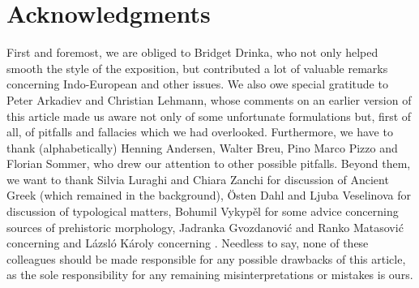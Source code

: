 \documentclass[output=paper]{langsci/langscibook}
\begin{document}
\section*{Acknowledgments}
First and foremost, we are obliged to Bridget Drinka, who not only helped smooth the style of the exposition, but contributed a lot of valuable remarks concerning Indo-European and other issues. We also owe special gratitude to Peter Arkadiev and Christian Lehmann, whose comments on an earlier version of this article made us aware not only of some unfortunate formulations but, first of all, of pitfalls and fallacies which we had overlooked. Furthermore, we have to thank (alphabetically) Henning Andersen, Walter Breu, Pino Marco Pizzo and Florian Sommer, who drew our attention to other possible pitfalls. Beyond them, we want to thank Silvia Luraghi and Chiara Zanchi for discussion of Ancient Greek (which remained in the background), Östen Dahl and Ljuba Veselinova for discussion of typological matters, Bohumil Vykypěl for some advice concerning sources of prehistoric  morphology, Jadranka Gvozdanović and Ranko Matasović concerning  and Lázsló Károly concerning . Needless to say, none of these colleagues should be made responsible for any possible drawbacks of this article, as the sole responsibility for any remaining misinterpretations or mistakes is ours.
\end{document}

